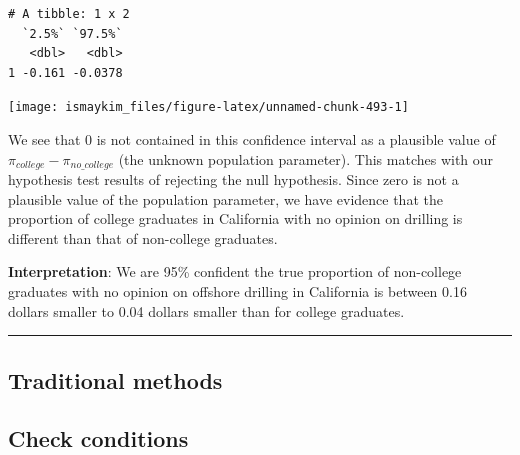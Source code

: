 \documentclass[12pt,]{krantz}
\makeatletter
\newenvironment{Shaded}{\begin{snugshade}}{\end{snugshade}}
\newcommand{\KeywordTok}[1]{\textcolor[rgb]{0.27,0.27,0.27}{\textbf{#1}}}
\newcommand{\DataTypeTok}[1]{\textcolor[rgb]{0.27,0.27,0.27}{#1}}
\newcommand{\StringTok}[1]{\textcolor[rgb]{0.5,0.5,0.5}{#1}}
\newcommand{\OperatorTok}[1]{\textcolor[rgb]{0.43,0.43,0.43}{\textbf{#1}}}
\newcommand{\NormalTok}[1]{#1}
\newenvironment{kframe}{%
\medskip{}
\setlength{\fboxsep}{.8em}
 \def\at@end@of@kframe{}%
 \ifinner\ifhmode%
  \def\at@end@of@kframe{\end{minipage}}%
  \begin{minipage}{\columnwidth}%
 \fi\fi%
 \def\FrameCommand##1{\hskip\@totalleftmargin \hskip-\fboxsep
 \colorbox{shadecolor}{##1}\hskip-\fboxsep
     \hskip-\linewidth \hskip-\@totalleftmargin \hskip\columnwidth}%
 \MakeFramed {\advance\hsize-\width
   \@totalleftmargin\z@ \linewidth\hsize
   \@setminipage}}%
 {\par\unskip\endMakeFramed%
 \at@end@of@kframe}
\renewenvironment{Shaded}{\begin{kframe}}{\end{kframe}}
\theoremstyle{definition}
\theoremstyle{definition}
\theoremstyle{definition}
\theoremstyle{remark}
\makeatother
\begin{document}
\begin{Shaded}
\end{Shaded}

\begin{verbatim}
# A tibble: 1 x 2
  `2.5%` `97.5%`
   <dbl>   <dbl>
1 -0.161 -0.0378
\end{verbatim}

\begin{Shaded}
\end{Shaded}

\begin{center}\texttt{[image: ismaykim\_files/figure-latex/unnamed-chunk-493-1]} \end{center}

We see that 0 is not contained in this confidence interval as a
plausible value of \(\pi_{college} - \pi_{no\_college}\) (the unknown
population parameter). This matches with our hypothesis test results of
rejecting the null hypothesis. Since zero is not a plausible value of
the population parameter, we have evidence that the proportion of
college graduates in California with no opinion on drilling is different
than that of non-college graduates.

\textbf{Interpretation}: We are 95\% confident the true proportion of
non-college graduates with no opinion on offshore drilling in California
is between 0.16 dollars smaller to 0.04 dollars smaller than for college
graduates.

\begin{center}\rule{0.5\linewidth}{\linethickness}\end{center}

\subsection{Traditional methods}\label{traditional-methods-2}

\subsection{Check conditions}\label{check-conditions-2}
\end{document}
